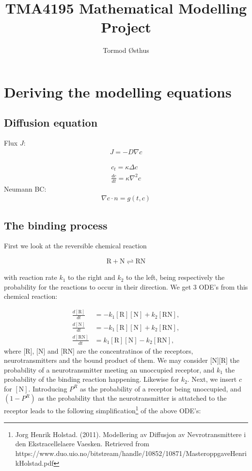 \documentclass[11pt, a4paper]{article}\usepackage[]{graphicx}\usepackage[]{color}
\author{Tormod Østhus}
\title{{\bf TMA4195} Mathematical Modelling Project}
\begin{document}
\maketitle

\section{Deriving the modelling equations}
\subsection*{Diffusion equation}
Flux $J$:
\begin{align*}
J = -D\nabla c
\end{align*}


\begin{align*}
c_t = \kappa \Delta c\\
\frac{dc}{dt} = \kappa \nabla^2 c
\end{align*}
Neumann BC:
\begin{align*}
\nabla c \cdot n = g(t,c)
\end{align*}

\subsection{The binding process}

First we look at the reversible chemical reaction

\begin{align*}
\text{R} + \text{N} \rightleftharpoons \text{RN}
\end{align*}

with reaction rate $k_1$ to the right and $k_2$ to the left, being respectively the probability for the reactions to occur in their direction. 
We get 3 ODE's from this chemical reaction:

\begin{align*}
\frac{d[\text{R}]}{dt} &= -k_1[\text{R}][\text{N}] + k_2[\text{RN}],\\
\frac{d[\text{N}]}{dt} &= -k_1[\text{R}][\text{N}] + k_2[\text{RN}],\\
\frac{d[\text{RN}]}{dt} &= k_1[\text{R}][\text{N}] - k_2[\text{RN}],
\end{align*}
where [R], [N] and [RN] are the concentratinos of the receptors, neurotransmitters and the bound product of them.
We may consider [N][R] the probability of a neurotransmitter meeting an unoccupied receptor, and $k_1$ the probability of the binding reaction happening. Likewise for $k_2$. Next, we insert $c$ for $[\text{N}]$.  Introducing $P^R$ as the probability of a receptor being unoccupied, and $(1-P^R)$ as the probability that the neurotransmitter is attatched to the receptor leads to the following simplification\footnote{Jorg Henrik Holstad. (2011). Modellering av Diffusjon av Nevrotransmittere i den Ekstracellelaere Vaesken. Retrieved from https://www.duo.uio.no/bitstream/handle/10852/10871/MasteroppgaveHenrikHolstad.pdf} of the above ODE's:
\end{document}
